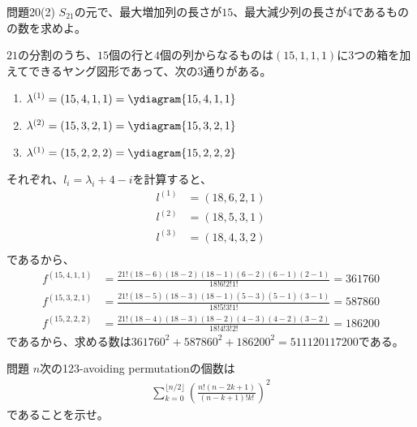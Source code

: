 \documentclass[a4paper,11pt]{jsarticle}
\theoremstyle{plain}
\theoremstyle{definition}
\renewcommand{\(}{\left(}
\renewcommand{\)}{\right)}
\renewcommand{\[}{\left[}
\renewcommand{\]}{\right]}
\renewcommand{\{}{\left\lbrace}
\renewcommand{\}}{\right\rbrace}
\begin{document}
\newpage

\begin{itembox}[l]{問題20(2)}
    $S_21$の元で、最大増加列の長さが$15$、最大減少列の長さが$4$であるものの数を求めよ。
\end{itembox}

$21$の分割のうち、$15$個の行と$4$個の列からなるものは$(15,1,1,1)$に3つの箱を加えてできるヤング図形であって、次の3通りがある。
\begin{enumerate}
    \item $\lambda^{(1)} = (15,4,1,1) = \ydiagram{15,4,1,1}$
    \item $\lambda^{(2)} = (15,3,2,1) = \ydiagram{15,3,2,1}$
    \item $\lambda^{(1)} = (15,2,2,2) = \ydiagram{15,2,2,2}$
\end{enumerate}

それぞれ、$l_i = \lambda_i + 4 - i$を計算すると、
\begin{align*}
    l^{(1)} &= (18,6,2,1) \\
    l^{(2)} &= (18,5,3,1) \\
    l^{(3)} &= (18,4,3,2) \\
\end{align*}
であるから、
\begin{align*}
    f^{(15,4,1,1)} &= \frac{21!(18-6)(18-2)(18-1)(6-2)(6-1)(2-1)}{18!6!2!1!} = 361760 \\
    f^{(15,3,2,1)} &= \frac{21!(18-5)(18-3)(18-1)(5-3)(5-1)(3-1)}{18!5!3!1!} = 587860 \\
    f^{(15,2,2,2)} &= \frac{21!(18-4)(18-3)(18-2)(4-3)(4-2)(3-2)}{18!4!3!2!} = 186200 
\end{align*}
であるから、求める数は$361760^2 + 587860^2 + 186200^2 = 511120117200$である。
\newpage

\begin{itembox}[l]{問題}
    $n$次の123-avoiding permutationの個数は
    \begin{align*}
        \sum_{k=0}^{\lfloor n/2 \rfloor} \(\frac{n! (n-2k+1)}{(n-k+1)! k!}\)^2
    \end{align*}   
    であることを示せ。
\end{itembox}
\end{document}

